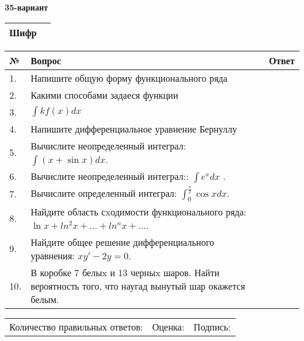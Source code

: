 \documentclass{article}
\begin{document}
  \egroup
  
  \newpage
  
  
  \textbf{35-вариант}\\
  
  \bgroup
  \def\arraystretch{1.6} %
  
  \begin{tabular}{|m{5.7cm}|m{9.5cm}|}
  \hline
  Шифр & \\
  \hline
  \end{tabular}
  
  \vspace{1cm}
  
  \begin{tabular}{|m{0.7cm}|m{10cm}|m{4cm}|}
  \hline
  № & Вопрос & Ответ \\
  \hline
  1. & Напишите общую форму функционального ряда &  \\
  \hline
  2. & Какими способами задаеся функции &  \\
  \hline
  3. & \(\int{kf(x)}dx\) &  \\
  \hline
  4. & Напишите дифференциальное уравнение Бернуллу &  \\
  \hline
  5. & Вычислите неопределенный интеграл: \(\int{(x + \sin x)}dx\). &  \\
  \hline
  6. & Вычислите неопределенный интеграл:: \(\int{e^{x}dx}\) . &  \\
  \hline
  7. & Вычислите определенный интеграл: \(\int_{0}^{\frac{\pi}{2}}{\cos xdx}\). &  \\
  \hline
  8. & Найдите область сxодимости функционального ряда: \(\ln x + ln^{2}x + ... + ln^{n}x + ...\). &  \\
  \hline
  9. & Найдите общее решение дифференциального уравнения: \(xy' - 2y = 0\). &  \\
  \hline
  10. & В коробке 7 белыx и 13 черныx шаров. Найти вероятность того, что наугад вынутый шар окажется белым. &  \\
  \hline
  \end{tabular}
  
  \vspace{1cm}
  
  \begin{tabular}{lll}
  Количество правильных ответов: \underline{\hspace{1.5cm}} & 
  Оценка: \underline{\hspace{1.5cm}} & 
  Подпись: \underline{\hspace{2cm}} \\
  \end{tabular}
  
\end{document}
